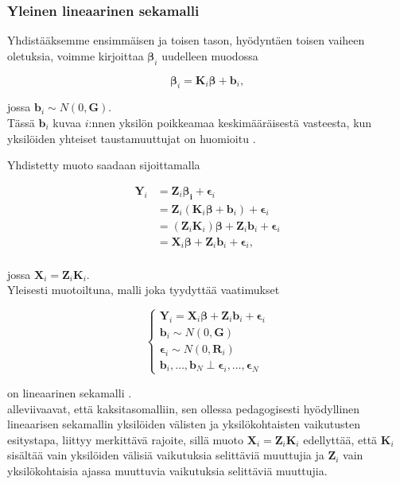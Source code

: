 \documentclass[finnish]{docopts}
\begin{document}
\subsubsection{Yleinen lineaarinen sekamalli}
\label{ssb:ylsm}

Yhdistääksemme ensimmäisen ja toisen tason, hyödyntäen toisen vaiheen oletuksia, voimme kirjoittaa $\bm{\beta}_i$ uudelleen muodossa

$$
\bm{\beta}_i = \bm{K}_i \bm{\beta} + \bm{b}_i,
$$

jossa $\bm{b}_i \sim N(0,\bm{G})$. \\

Tässä $\bm{b}_i$ kuvaa $i$:nnen yksilön poikkeamaa keskimääräisestä vasteesta, kun yksilöiden yhteiset taustamuuttujat on huomioitu \cite{fitzmaurice11}.

Yhdistetty muoto saadaan sijoittamalla

$$
\begin{aligned}
\bm{Y}_i &= \bm{Z}_i \bm{\beta_i} + \bm{\epsilon}_i \\
&= \bm{Z}_i (\bm{K}_i \bm{\beta} + \bm{b}_i) + \bm{\epsilon}_i \\
&= (\bm{Z}_i \bm{K}_i) \bm{\beta} + \bm{Z}_i \bm{b}_i + \bm{\epsilon}_i \\
&= \bm{X}_i \bm{\beta} + \bm{Z}_i \bm{b}_i + \bm{\epsilon}_i, \\
\end{aligned}
$$

jossa $\bm{X}_i = \bm{Z}_i \bm{K}_i$. \\

Yleisesti muotoiltuna, malli joka tyydyttää vaatimukset

$$
\left\{
    \begin{array}{ll}
        \bm{Y}_i = \bm{X}_i \bm{\beta} + \bm{Z}_i \bm{b}_i + \bm{\epsilon}_i \\
        \bm{b}_i \sim N(0,\bm{G}) \\
        \bm{\epsilon}_i \sim N(0,\bm{R}_i) \\
        \bm{b}_i, \dots , \bm{b}_N \perp \bm{\epsilon}_i, \dots , \bm{\epsilon}_N 
    \end{array}
\right.
$$

on lineaarinen sekamalli \cite{verbeke00, laird82}.\\


\cite{fitzmaurice11} alleviivaavat, että kaksitasomalliin, sen ollessa pedagogisesti hyödyllinen lineaarisen sekamallin yksilöiden välisten ja yksilökohtaisten vaikutusten esitystapa, liittyy merkittävä rajoite, sillä muoto  $\bm{X}_i = \bm{Z}_i \bm{K}_i$ edellyttää, että $\bm{K}_i$ sisältää vain yksilöiden välisiä vaikutuksia selittäviä muuttujia ja $\bm{Z}_i$ vain yksilökohtaisia ajassa muuttuvia vaikutuksia selittäviä muuttujia.
\end{document}

